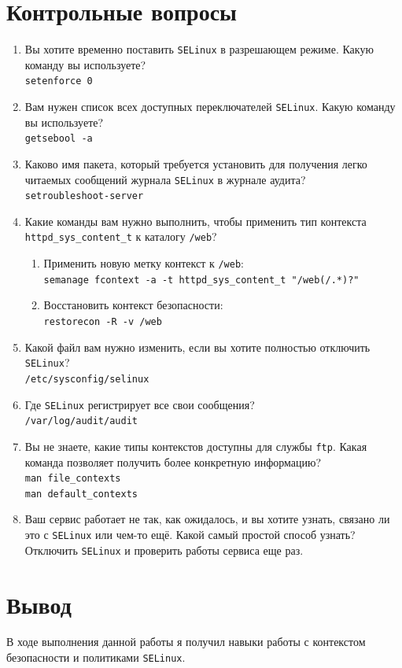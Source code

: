 \documentclass[12pt]{article}
\begin{document}
\section{Контрольные вопросы}
\begin{enumerate}
	\item Вы хотите временно поставить \texttt{SELinux} в разрешающем режиме. Какую команду вы используете? \\
	      \texttt{setenforce 0}
	\item Вам нужен список всех доступных переключателей \texttt{SELinux}. Какую команду вы используете? \\
	      \texttt{getsebool -a}
	\item Каково имя пакета, который требуется установить для получения легко читаемых сообщений журнала \texttt{SELinux} в журнале аудита? \\
	      \texttt{setroubleshoot-server}
	\item Какие команды вам нужно выполнить, чтобы применить тип контекста \texttt{httpd\_sys\_content\_t} к каталогу \texttt{/web}? \\
	      \begin{enumerate}
		      \item Применить новую метку контекст к \texttt{/web}: \\
		            \texttt{semanage fcontext -a -t httpd\_sys\_content\_t "/web(/.*)?"}
		      \item Восстановить контекст безопасности: \\
		            \texttt{restorecon -R -v /web}
	      \end{enumerate}
	\item Какой файл вам нужно изменить, если вы хотите полностью отключить \texttt{SELinux}? \\
	      \texttt{/etc/sysconfig/selinux}
	\item Где \texttt{SELinux} регистрирует все свои сообщения? \\
	      \texttt{/var/log/audit/audit}
	\item Вы не знаете, какие типы контекстов доступны для службы \texttt{ftp}. Какая команда позволяет получить более конкретную информацию? \\
	      \texttt{man file\_contexts} \\
	      \texttt{man default\_contexts}
	\item Ваш сервис работает не так, как ожидалось, и вы хотите узнать, связано ли это с \texttt{SELinux} или чем-то ещё. Какой самый простой способ узнать? \\
	      Отключить \texttt{SELinux} и проверить работы сервиса еще раз.
\end{enumerate}

\section{Вывод}
В ходе выполнения данной работы я получил навыки работы с контекстом безопасности и политиками \texttt{SELinux}.
\end{document}
